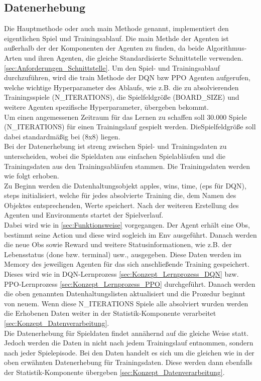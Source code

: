 \subsection{Datenerhebung} \label{sec:Konzept_Datenerhebung}
Die Hauptmethode oder auch main Methode genannt, implementiert den eigentlichen Spiel und Trainingsablauf. Die main Methde der Agenten ist außerhalb der der Komponenten der Agenten zu finden, da beide Algorithmus-Arten und ihren Agenten, die gleiche Standardisierte Schnittstelle verwenden. \ref{sec:Anforderungen_Schnittstelle}. 
Um den Spiel- und Trainingsablauf durchzuführen, wird die train Methode der DQN bzw PPO Agenten aufgerufen, welche wichtige Hyperparameter des Ablaufs, wie z.B. die zu absolvierenden Trainingsspiele (N\_ITERATIONS), die Spielfeldgröße (BOARD\_SIZE) und weitere Agenten spezifische Hyperparameter, übergeben bekommt.\\
Um einen angemessenen Zeitraum für das Lernen zu schaffen soll 30.000 Spiele (N\_ITERATIONS) für einen Trainingslauf gespielt werden. DieSpielfeldgröße soll dabei standardmäßig bei (8x8) liegen.\\
Bei der Datenerhebung ist streng zwischen Spiel- und Trainingsdaten zu unterscheiden, wobei die Spieldaten aus einfachen Spielabläufen und die Trainingsdaten aus den Trainingsabläufen stammen. Die Trainingsdaten werden wie folgt erhoben.\\
Zu Beginn werden die Datenhaltungsobjekt apples, wins, time, (eps für DQN), steps initialisiert, welche für jedes absolvierte Training die, dem Namen des Objektes entsprechenden, Werte speichert. Nach der weiteren Erstellung des Agenten und Environments startet der Spielverlauf.\\
Dabei wird wie in \ref{sec:Funktionsweise} vorgegangen. Der Agent erhält eine Obs, bestimmt seine Action und diese wird sogleich im Env ausgeführt. Danach werden die neue Obs sowie Reward und weitere Statusinformationen, wie z.B. der Lebensstatus (done bzw. terminal) usw., ausgegeben. Diese Daten werden im Memory des jeweiligen Agenten für das sich anschließende Training gespeichert. Dieses wird wie in DQN-Lernprozess \ref{sec:Konzept_Lernprozess_DQN} bzw. PPO-Lernprozess \ref{sec:Konzept_Lernprozess_PPO} durchgeführt. Danach werden die oben genannten Datenhaltungslisten aktualisiert und die Prozedur beginnt von neuem. Wenn diese N\_ITERATIONS Spiele alle absolviert wurden werden die Erhobenen Daten weiter in der Statistik-Komponente verarbeitet \ref{sec:Konzept_Datenverarbeitung}.\\
Die Datenerhebung für Spieldaten findet annähernd auf die gleiche Weise statt. Jedoch werden die Daten in nicht nach jedem Trainingslauf entnommen, sondern nach jeder Spielepisode. Bei den Daten handelt es sich um die gleichen wie in der oben erwähnten Datenerhebung für Trainingsdaten. Diese werden dann ebenfalls der Statistik-Komponente übergeben \ref{sec:Konzept_Datenverarbeitung}.

